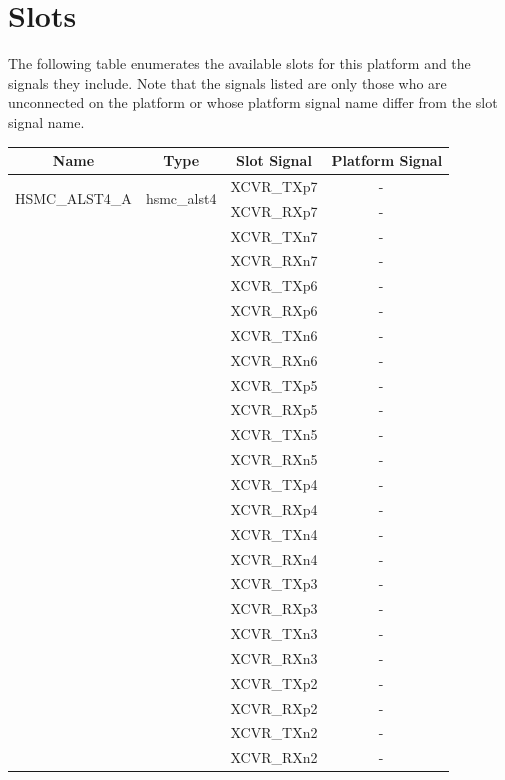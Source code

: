 \documentclass{article}
\begin{document}
\section*{Slots}
The following table enumerates the available slots for this platform and the signals they include. Note that the signals listed are only those who are unconnected on the platform or whose platform signal name differ from the slot signal name. \\
\begin{longtable}[l]{|c|c|c|c|}
	\hline
	\rowcolor{blue}
	Name           & Type & Slot Signal & Platform Signal  \\
	\hline
	\multirow{2}{*}{HSMC\_ALST4\_A} & \multirow{2}{*}{hsmc\_alst4} & XCVR\_TXp7 & -  \
  \\\cline{3-4}
  & & XCVR\_RXp7 & - \
  \\\cline{3-4}
  & & XCVR\_TXn7 & - \
  \\\cline{3-4}
  & & XCVR\_RXn7 & - \
  \\\cline{3-4}
  & & XCVR\_TXp6 & - \
  \\\cline{3-4}
  & & XCVR\_RXp6 & - \
  \\\cline{3-4}
  & & XCVR\_TXn6 & - \
  \\\cline{3-4}
  & & XCVR\_RXn6 & - \
  \\\cline{3-4}
  & & XCVR\_TXp5 & - \
  \\\cline{3-4}
  & & XCVR\_RXp5 & - \
  \\\cline{3-4}
  & & XCVR\_TXn5 & - \
  \\\cline{3-4}
  & & XCVR\_RXn5 & - \
  \\\cline{3-4}
  & & XCVR\_TXp4 & - \
  \\\cline{3-4}
  & & XCVR\_RXp4 & - \
  \\\cline{3-4}
  & & XCVR\_TXn4 & - \
  \\\cline{3-4}
  & & XCVR\_RXn4 & - \
  \\\cline{3-4}
  & & XCVR\_TXp3 & - \
  \\\cline{3-4}
  & & XCVR\_RXp3 & - \
  \\\cline{3-4}
  & & XCVR\_TXn3 & - \
  \\\cline{3-4}
  & & XCVR\_RXn3 & - \
  \\\cline{3-4}
  & & XCVR\_TXp2 & - \
  \\\cline{3-4}
  & & XCVR\_RXp2 & - \
  \\\cline{3-4}
  & & XCVR\_TXn2 & - \
  \\\cline{3-4}
  & & XCVR\_RXn2 & - \
  \\\cline{3-4}

\end{longtable}
\end{document}
